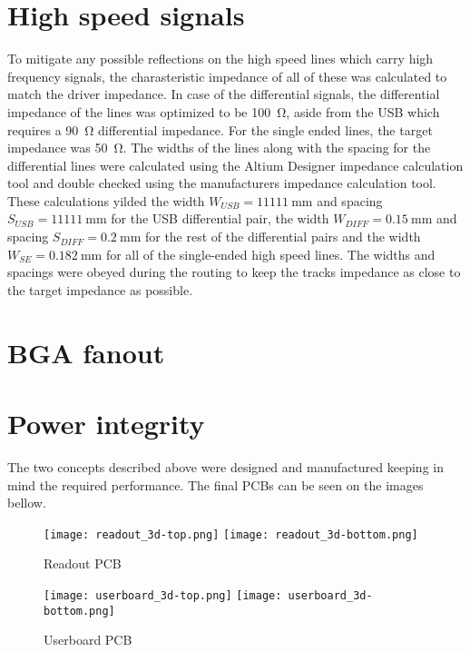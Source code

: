 \section{High speed signals}
To mitigate any possible reflections on the high speed lines which carry high frequency signals, the charasteristic impedance of all of these was calculated to match the driver impedance. In case of the differential signals, the differential impedance of the lines was optimized to be \SI{100}{\ohm}, aside from the USB which requires a \SI{90}{\ohm} differential impedance. For the single ended lines, the target impedance was \SI{50}{\ohm}. The widths of the lines along with the spacing for the differential lines were calculated using the Altium Designer impedance calculation tool and double checked using the manufacturers impedance calculation tool. These calculations yilded the width $W_{USB} = \SI{11111}{\milli\meter}$ and spacing $S_{USB} = \SI{11111}{\milli\meter}$ for the USB differential pair, the width $W_{DIFF} = \SI{0.15}{\milli\meter}$ and spacing $S_{DIFF} = \SI{0.2}{\milli\meter}$ for the rest of the differential pairs and the width $W_{SE} = \SI{0.182}{\milli\meter}$ for all of the single-ended high speed lines. The widths and spacings were obeyed during the routing to keep the tracks impedance as close to the target impedance as possible.

\section{BGA fanout}


\section{Power integrity}

The two concepts described above were designed and manufactured keeping in mind the required performance. The final PCBs can be seen on the images bellow. 
\newpage
\FloatBarrier
\begin{figure}[htp!]
    \centering
    \texttt{[image: readout\_3d-top.png]}
    \texttt{[image: readout\_3d-bottom.png]}
    \caption{Readout PCB}
    \label{fig:readout_3d}
\end{figure}
\FloatBarrier

\FloatBarrier
\begin{figure}[htp!]
    \centering
    \texttt{[image: userboard\_3d-top.png]}
    \hspace{1.8cm}
    \texttt{[image: userboard\_3d-bottom.png]}
    \caption{Userboard PCB}
    \label{fig:userboard_3d}
\end{figure}
\FloatBarrier

